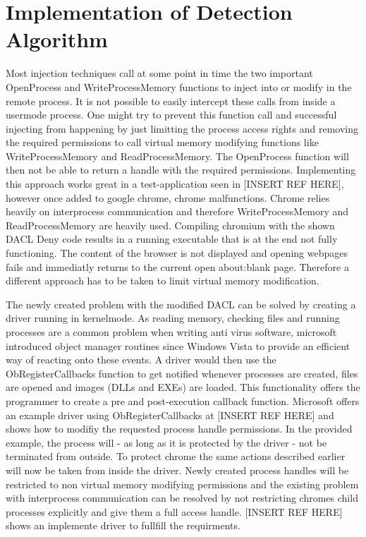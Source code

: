 \section{Implementation of Detection Algorithm}
Most injection techniques call at some point in time the two important OpenProcess and WriteProcessMemory functions to inject into or modify in the remote process. It is not possible to easily intercept these calls from inside a usermode process. One might try to prevent this function call and successful injecting from happening by just limitting the process access rights and removing the required permissions to call virtual memory modifying functions like WriteProcessMemory and ReadProcessMemory. The OpenProcess function will then not be able to return a handle with the required permissions. Implementing this approach works great in a test-application seen in [INSERT REF HERE], however once added to google chrome, chrome malfunctions. Chrome relies heavily on interprocess communication and therefore WriteProcessMemory and ReadProcessMemory are heavily used. Compiling chromium with the shown DACL Deny code results in a running executable that is at the end not fully functioning. The content of the browser is not displayed and opening webpages fails and immediatly returns to the current open about:blank page. Therefore a different approach has to be taken to limit virtual memory modification.

The newly created problem with the modified DACL can be solved by creating a driver running in kernelmode. As reading memory, checking files and running processes are a common problem when writing anti virus software, microsoft introduced object manager routines since Windows Vista to provide an efficient way of reacting onto these events. A driver would then use the ObRegisterCallbacks function to get notified whenever processes are created, files are opened and images (DLLs and EXEs) are loaded. This functionality offers the programmer to create a pre and post-execution callback function. Microsoft offers an example driver using ObRegisterCallbacks at [INSERT REF HERE] and shows how to modifiy the requested process handle permissions. In the provided example, the process will - as long as it is protected by the driver - not be terminated from outside. To protect chrome the same actions described earlier will now be taken from inside the driver. Newly created process handles will be restricted to non virtual memory modifying permissions and the existing problem with interprocess communication can be resolved by not restricting chromes child processes explicitly and give them a full access handle. [INSERT REF HERE] shows an implemente driver to fullfill the requirments. 